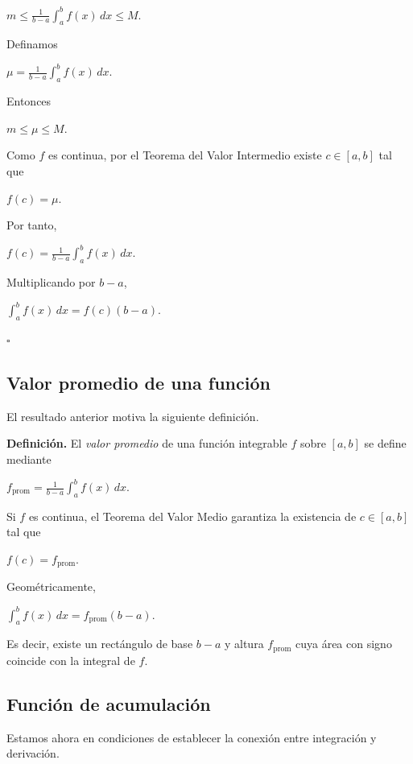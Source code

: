 \documentclass[12pt]{article}
\begin{document}
$
m
\leq
\frac{1}{b-a}
\int_a^b f(x)\,dx
\leq
M.
$

Definamos

$
\mu
=
\frac{1}{b-a}
\int_a^b f(x)\,dx.
$

Entonces

$
m\leq\mu\leq M.
$

Como $f$ es continua, por el Teorema del Valor Intermedio existe
$c\in[a,b]$ tal que

$
f(c)=\mu.
$

Por tanto,

$
f(c)
=
\frac{1}{b-a}
\int_a^b f(x)\,dx.
$

Multiplicando por $b-a$,

$
\boxed{
\int_a^b f(x)\,dx
=
f(c)(b-a).
}
$

\hfill$\square$

\subsection*{Valor promedio de una función}

El resultado anterior motiva la siguiente definición.

\textbf{Definición.}
El \emph{valor promedio} de una función integrable $f$ sobre $[a,b]$ se
define mediante

$
\boxed{
f_{\mathrm{prom}}
=
\frac{1}{b-a}
\int_a^b f(x)\,dx.
}
$

Si $f$ es continua, el Teorema del Valor Medio garantiza la existencia de
$c\in[a,b]$ tal que

$
f(c)=f_{\mathrm{prom}}.
$

Geométricamente,

$
\int_a^b f(x)\,dx
=
f_{\mathrm{prom}}(b-a).
$

Es decir, existe un rectángulo de base $b-a$ y altura
$f_{\mathrm{prom}}$ cuya área con signo coincide con la integral de $f$.

\subsection*{Función de acumulación}

Estamos ahora en condiciones de establecer la conexión entre integración
y derivación.
\end{document}
